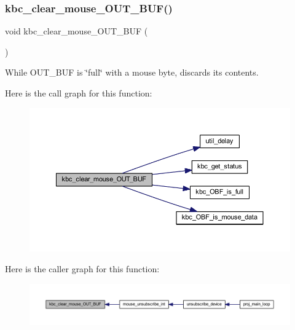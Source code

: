 \subsubsection{\texorpdfstring{kbc\+\_\+clear\+\_\+mouse\+\_\+\+O\+U\+T\+\_\+\+B\+U\+F()}{kbc\_clear\_mouse\_OUT\_BUF()}}
{\footnotesize\ttfamily void kbc\+\_\+clear\+\_\+mouse\+\_\+\+O\+U\+T\+\_\+\+B\+UF (\begin{DoxyParamCaption}{ }\end{DoxyParamCaption})}



While O\+U\+T\+\_\+\+B\+UF is \char`\"{}full\char`\"{} with a mouse byte, discards its contents. 

Here is the call graph for this function\+:\nopagebreak
\begin{figure}[H]
\begin{center}
\leavevmode
\includegraphics[width=350pt]{group__keyboard_ga3c87ba94c8bab09066553ba6d89c07c8_cgraph}
\end{center}
\end{figure}
Here is the caller graph for this function\+:\nopagebreak
\begin{figure}[H]
\begin{center}
\leavevmode
\includegraphics[width=350pt]{group__keyboard_ga3c87ba94c8bab09066553ba6d89c07c8_icgraph}
\end{center}
\end{figure}
\mbox{\label{group__keyboard_ga71424d3c0eee59d712469efc0f137d60}} 
